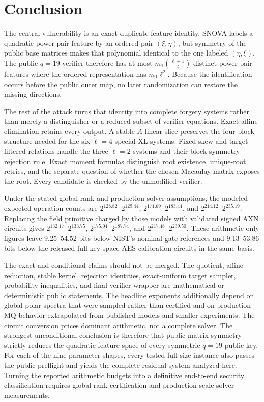 \documentclass[11pt]{article}
\newcommand{\SNOVA}{\textsf{SNOVA}}
\newcommand{\LoneModelRange}{$2^{128.82}$--$2^{129.44}$}
\newcommand{\LthreeModelRange}{$2^{171.69}$--$2^{183.44}$}
\newcommand{\LfiveModelRange}{$2^{214.12}$--$2^{235.19}$}
\newcommand{\LoneAXNRange}{$2^{132.17}$--$2^{133.75}$}
\newcommand{\LthreeAXNRange}{$2^{175.04}$--$2^{187.74}$}
\newcommand{\LfiveAXNRange}{$2^{217.48}$--$2^{239.50}$}
\newcommand{\AXNNominalHeadroomRange}{9.25--54.52}
\newcommand{\AXNFullAESGapRange}{9.13--53.86}
\begin{document}
\section{Conclusion}\label{sec:conclusion}

The central vulnerability is an exact duplicate-feature identity.  \SNOVA{}
labels a quadratic power-pair feature by an ordered pair $(\xi,\eta)$, but
symmetry of the public base matrices makes that polynomial identical to the
one labeled $(\eta,\xi)$.  The public $q=19$ verifier therefore has at most
$m_1\binom{\ell+1}{2}$ distinct power-pair features where the ordered
representation has $m_1\ell^2$.  Because the identification occurs before the
public outer map, no later randomization can restore the missing directions.

The rest of the attack turns that identity into complete forgery systems rather
than merely a distinguisher or a reduced subset of verifier equations.  Exact
affine elimination retains every output.  A stable $A$-linear slice preserves
the four-block structure needed for the six $\ell=4$ special-XL systems.
Fixed-skew and target-filtered relations handle the three $\ell=2$ systems and
their block-symmetry rejection rule.  Exact moment formulas distinguish root
existence, unique-root retries, and the separate question of whether the
chosen Macaulay matrix exposes the root.  Every candidate is checked by the
unmodified verifier.

Under the stated global-rank and production-solver assumptions, the modeled
expected operation counts are \LoneModelRange, \LthreeModelRange, and
\LfiveModelRange.  Replacing the field primitive charged by those models with
validated signed AXN circuits gives \LoneAXNRange, \LthreeAXNRange, and
\LfiveAXNRange.  These arithmetic-only figures leave
\AXNNominalHeadroomRange{} bits below NIST's nominal gate references and
\AXNFullAESGapRange{} bits below the released full-key-space AES calibration
circuits in the same basis.

The exact and conditional claims should not be merged.  The quotient, affine
reduction, stable kernel, rejection identities, exact-uniform target sampler,
probability inequalities, and final-verifier wrapper are mathematical or
deterministic public statements.  The headline exponents additionally depend
on global polar spectra that were sampled rather than certified and on
production MQ behavior extrapolated from published models and smaller
experiments.  The circuit conversion prices dominant arithmetic, not a
complete solver.  The strongest unconditional conclusion is therefore that public-matrix
symmetry strictly reduces the quadratic feature space of every symmetric
$q=19$ public key.  For each of the nine parameter shapes, every tested
full-size instance also passes the public preflight and yields the complete
residual system analyzed here.  Turning the reported arithmetic budgets into a
definitive end-to-end security classification requires global rank
certification and production-scale solver measurements.
\end{document}
